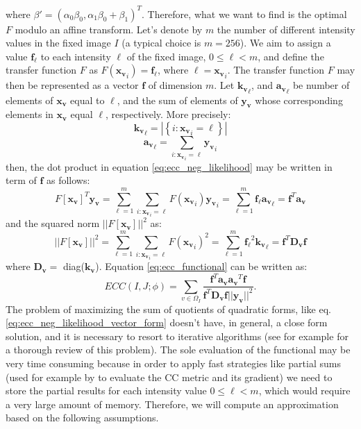 where $\beta' = (\alpha_{0}\beta_{0}, \alpha_{1}\beta_{0} + \beta_{1})^{T}$. Therefore, what we want to find is the optimal $F$ modulo an affine transform. Let's denote by $m$ the number of different intensity values in the fixed image $I$ (a typical choice is $m=256$). We aim to assign a value $\mathbf{f}_{\ell}$ to each intensity $\ell$ of the fixed image, $0\leq \ell < m$, and define the transfer function $F$ as $F(\mathbf{x_{v}}_{i}) = \mathbf{f}_{\ell}$, where $\ell = \mathbf{x_{v}}_{i}$. The transfer function $F$ may then be represented as a vector $\mathbf{f}$ of dimension $m$. Let $\mathbf{k_{v}}_{\ell}$, and $\mathbf{a_{v}}_{\ell}$ be number of elements of $\mathbf{x_{v}}$ equal to $\ell$, and the sum of elements of $\mathbf{y_{v}}$ whose corresponding elements in $\mathbf{x_{v}}$ equal $\ell$, respectively. More precisely:
\begin{displaymath}
    \mathbf{k_{v}}_{\ell} = |\left\lbrace i : \mathbf{x_{v}}_{i}=\ell \right\rbrace|
\end{displaymath}
\begin{displaymath}
    \mathbf{a_{v}}_{\ell} = \sum_{i:\mathbf{x_{v}}_{i}=\ell} \mathbf{y_{v}}_{i}
\end{displaymath}
then, the dot product in equation \eqref{eq:ecc_neg_likelihood} may be written in term of $\mathbf{f}$ as follows:
\begin{displaymath}
    F\left[\mathbf{x_{v}}\right]^{T} \mathbf{y_{v}} = \sum_{\ell=1}^{m} \sum_{i:\mathbf{x_{v}}_{i}=\ell} F(\mathbf{x_{v}}_{i})\mathbf{y_{v}}_{i}
    =\sum_{\ell=1}^{m} \mathbf{f_{\ell}}\mathbf{a_{v}}_{\ell} = \mathbf{f}^{T}\mathbf{a_{v}}
\end{displaymath}
and the squared norm $||F[\mathbf{x_{v}}]||^{2}$ as:
\begin{displaymath}
    ||F\left[\mathbf{x_{v}}\right]||^{2} = \sum_{\ell=1}^{m} \sum_{i:\mathbf{x_{v}}_{i}=\ell} F(\mathbf{x_{v}}_{i})^{2}
    = \sum_{\ell=1}^{m} \mathbf{f_{\ell}}^{2} \mathbf{k_{v}}_{\ell} = \mathbf{f}^{T} \mathbf{D_{v}} \mathbf{f}
\end{displaymath}
where $\mathbf{D_{v}} = $ diag($\mathbf{k_{v}}$). Equation \eqref{eq:ecc_functional} can be written as:
\begin{equation}\label{eq:ecc_neg_likelihood_vector_form}
    ECC(I, J;\phi) = \sum_{v\in\Omega_{I}}\frac{\mathbf{f}^{T}\mathbf{a_{v}}\mathbf{a_{v}}^{T}\mathbf{f}}
    {\mathbf{f}^{T} \mathbf{D_{v}} \mathbf{f}||\mathbf{y_{v}}||^{2}}.
\end{equation}
The problem of maximizing the sum of quotients of quadratic forms, like eq. \eqref{eq:ecc_neg_likelihood_vector_form} doesn't have, in general, a close form solution, and it is necessary to resort to iterative algorithms (see for example \cite{Kiers1995} for a thorough review of this problem). The sole evaluation of the functional may be very time consuming because in order to apply fast strategies like partial sums (used for example by \cite{Avants2008} to evaluate the CC metric and its gradient) we need to store the partial results for each intensity value $0 \leq \ell < m$, which would require a very large amount of memory. Therefore, we will compute an approximation based on the following assumptions.\\

